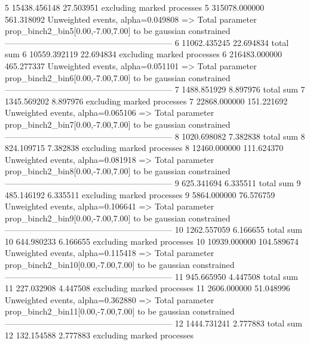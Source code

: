 5          15438.456148    27.503951       excluding marked processes    
5          315078.000000   561.318092      Unweighted events, alpha=0.049808
  => Total parameter prop_binch2_bin5[0.00,-7.00,7.00] to be gaussian constrained
------------------------------------------------------------
6          11062.435245    22.694834       total sum                     
6          10559.392119    22.694834       excluding marked processes    
6          216483.000000   465.277337      Unweighted events, alpha=0.051101
  => Total parameter prop_binch2_bin6[0.00,-7.00,7.00] to be gaussian constrained
------------------------------------------------------------
7          1488.851929     8.897976        total sum                     
7          1345.569202     8.897976        excluding marked processes    
7          22868.000000    151.221692      Unweighted events, alpha=0.065106
  => Total parameter prop_binch2_bin7[0.00,-7.00,7.00] to be gaussian constrained
------------------------------------------------------------
8          1020.698082     7.382838        total sum                     
8          824.109715      7.382838        excluding marked processes    
8          12460.000000    111.624370      Unweighted events, alpha=0.081918
  => Total parameter prop_binch2_bin8[0.00,-7.00,7.00] to be gaussian constrained
------------------------------------------------------------
9          625.341694      6.335511        total sum                     
9          485.146192      6.335511        excluding marked processes    
9          5864.000000     76.576759       Unweighted events, alpha=0.106641
  => Total parameter prop_binch2_bin9[0.00,-7.00,7.00] to be gaussian constrained
------------------------------------------------------------
10         1262.557059     6.166655        total sum                     
10         644.980233      6.166655        excluding marked processes    
10         10939.000000    104.589674      Unweighted events, alpha=0.115418
  => Total parameter prop_binch2_bin10[0.00,-7.00,7.00] to be gaussian constrained
------------------------------------------------------------
11         945.665950      4.447508        total sum                     
11         227.032908      4.447508        excluding marked processes    
11         2606.000000     51.048996       Unweighted events, alpha=0.362880
  => Total parameter prop_binch2_bin11[0.00,-7.00,7.00] to be gaussian constrained
------------------------------------------------------------
12         1444.731241     2.777883        total sum                     
12         132.154588      2.777883        excluding marked processes    

